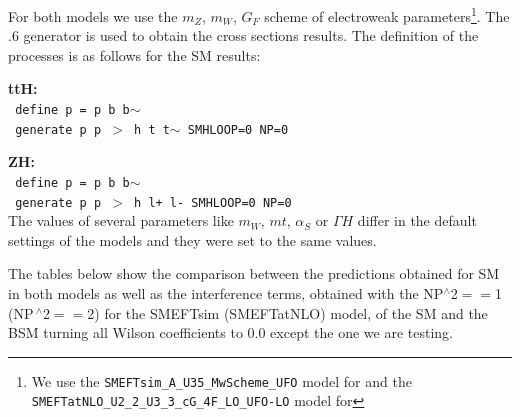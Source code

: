 For both models we use the $m_Z$, $m_W$, $G_F$ scheme of electroweak parameters\footnote{We use the \texttt{SMEFTsim\_A\_U35\_MwScheme\_UFO} model for \SMEFTsim and the \texttt{SMEFTatNLO\_U2\_2\_U3\_3\_cG\_4F\_LO\_UFO-LO} model for \SMEFTatNLO}. The .6 generator is used to obtain the cross sections results. The definition of the processes is as follows for the SM results:

\noindent
{\bf ttH:}\\
\noindent
  \texttt{ define p = p b b$\sim$ }\\
  \texttt{ generate p p $>$ h t t$\sim$ SMHLOOP=0 NP=0 }

\noindent
{\bf ZH:}\\
  \noindent
  \texttt{ define p = p b b$\sim$} \\
  \texttt{ generate p p $>$ h l+ l- SMHLOOP=0  NP=0     }\\
  
  The values of several parameters like $m_W$, $mt$, $\alpha_S$ or $\Gamma H$ differ in the default settings of the models and they were set to the same values.

  The tables below show the comparison between the predictions obtained for SM in both models as well as the interference terms, obtained with the NP$^{\wedge}$2$==$1 (NP$^{\
\wedge}$2$==$2)  for the SMEFTsim (SMEFTatNLO) model, of the SM and the BSM turning all Wilson coefficients to 0.0 except the one we are testing.\\

